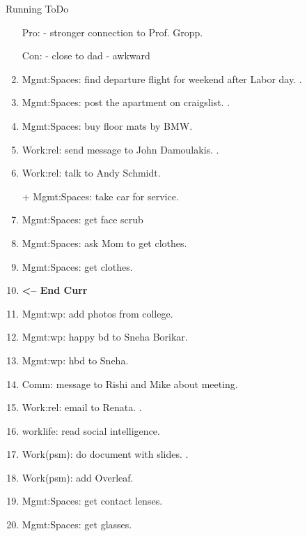 \begin{columns}
\begin{column}{0.6\linewidth}
\begin{block}{Running ToDo}
\begin{enumerate}
        Pro: 
        - stronger connection to Prof. Gropp. 

        Con: 
         - close to dad
         - awkward 

       \item \tiny Mgmt:Spaces: find departure flight for weekend
         after Labor day.    . 
         
      \item \tiny Mgmt:Spaces: post the apartment on
        craigslist.  .

      \item \tiny Mgmt:Spaces: buy floor mats by BMW. 

     \item \tiny Work:rel: send message to John Damoulakis.  . 
     \item \tiny Work:rel: talk to Andy Schmidt.  

        +
        Mgmt:Spaces: take car for service. 

      \item \tiny Mgmt:Spaces: get face scrub
        \item \tiny Mgmt:Spaces: ask Mom to get clothes.
        \item \tiny Mgmt:Spaces: get clothes. 

        \item \tiny \textbf{ <-- End Curr }

        \item \tiny Mgmt:wp: add photos from college.           
        \item \tiny Mgmt:wp: happy bd to Sneha Borikar. 
        \item \tiny Mgmt:wp: hbd to Sneha. 
          
        \item \tiny Comm: message to Rishi and Mike about meeting. 
        \item \tiny Work:rel: email to Renata. . 
        \item \tiny worklife: read social intelligence.  
        \item \tiny Work(psm): do document with slides. .    
        \item \tiny Work(psm): add Overleaf.            
        \item \tiny Mgmt:Spaces: get contact lenses.
        \item \tiny Mgmt:Spaces: get glasses. 



\end{enumerate}
\end{block}
\end{column}
\end{columns}
